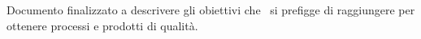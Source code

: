 Documento finalizzato a descrivere gli obiettivi che \gruppo\ si prefigge di raggiungere per ottenere processi e prodotti di qualità.